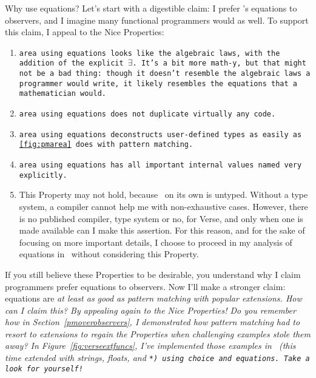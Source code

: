 \documentclass[manuscript,screen,review, 12pt, nonacm]{acmart}
\begin{document}
\begin{outline}[enumerate]
    Why use equations? Let's start with a digestible claim: I prefer \VC's
    equations to observers, and I imagine many functional programmers would as
    well. To support this claim, I appeal to the Nice Properties: 

    \begin{enumerate}
      \item \tt{area} using equations looks like the algebraic laws, with the
      addition of the explicit $\exists$. It's a bit more math-y, but that might
      not be a bad thing: though it doesn't resemble the algebraic laws a
      programmer would write, it likely resembles the equations that a
      mathematician would. 
      \item \tt{area} using equations does not duplicate virtually any code. 
      \item \tt{area} using equations deconstructs user-defined types as easily
      as \ref{fig:pmarea} does with pattern matching. 
      \item \tt{area} using equations has all important internal values named
      very explicitly.
      \item This Property may not hold, because \VC\ on its own is untyped.
      Without a type system, a compiler cannot help me with non-exhaustive
      cases. However, there is no published compiler, type system or no, for
      Verse, and only when one is made available can I make this assertion. For
      this reason, and for the sake of focusing on more important details, I
      choose to proceed in my analysis of equations in \VC\ without considering
      this Property. 
    \end{enumerate}

    If you still believe these Properties to be desirable, you understand why I
    claim programmers prefer equations to observers. Now I'll make a stronger
    claim: equations are \it{at least as good as} pattern matching with popular
    extensions. How can I claim this? By appealing again to the Nice Properties!
    Do you remember how in Section~\ref{pmoverobservers}, I demonstrated how
    pattern matching had to resort to extensions to regain the Properties when
    challenging examples stole them away? In Figure~\ref{fig:verseextfuncs},
    I've implemented those examples in \VC\ (this time extended with strings,
    floats, and \tt{*}) using choice and equations. Take a look for yourself! 


\end{outline}
\end{document}
